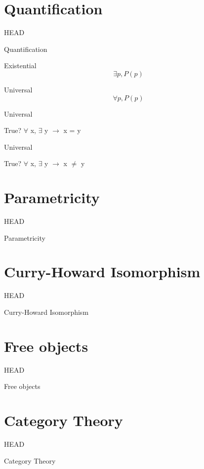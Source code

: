 \documentclass[utf8x,notes,17pt]{beamer}
\newcommand{\head}[1]{\begin{center}
\vspace{13mm}\hspace{-1mm}\Huge{{#1}}
\end{center}}
\begin{document}
\section{Quantification}
\label{sec-9}
\begin{frame}[fragile,plain,label=sec-9-1]{HEAD}
\head{Quantification}
\end{frame}
\begin{frame}[fragile,label=sec-9-2]{Existential}
\[ \exists p, P(p) \]
\end{frame}
\begin{frame}[fragile,label=sec-9-3]{Universal}
\[ \forall p, P(p) \]
\end{frame}
\begin{frame}[fragile,label=sec-9-4]{Universal}
\begin{alertblock}{True?}%
$\forall$ x, $\exists$ y $\rightarrow$ x = y
\end{alertblock}
\end{frame}
\begin{frame}[fragile,label=sec-9-5]{Universal}
\begin{alertblock}{True?}%
$\forall$ x, $\exists$ y $\rightarrow$ x $\neq$ y
\end{alertblock}
\end{frame}
\section{Parametricity}
\label{sec-10}
\begin{frame}[fragile,plain,label=sec-10-1]{HEAD}
\head{Parametricity}
\end{frame}
\section{Curry-Howard Isomorphism}
\label{sec-11}
\begin{frame}[fragile,plain,label=sec-11-1]{HEAD}
\head{Curry-Howard Isomorphism}
\end{frame}
\section{Free objects}
\label{sec-12}
\begin{frame}[fragile,plain,label=sec-12-1]{HEAD}
\head{Free objects}
\end{frame}
\section{Category Theory}
\label{sec-13}
\begin{frame}[fragile,plain,label=sec-13-1]{HEAD}
\head{Category Theory}
\end{frame}
\end{document}
